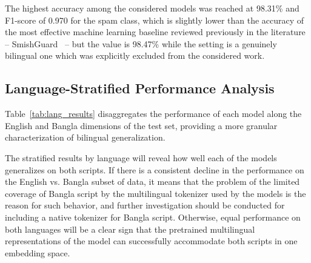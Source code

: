 \documentclass[journal]{IEEEtran}
\begin{document}
The highest accuracy among the considered models was reached at 98.31\%
and F1-score of 0.970 for the spam class, which is slightly lower than
the accuracy of the most effective machine learning baseline reviewed
previously in the literature -- SmishGuard~\cite{ref6} -- but the value is
98.47\% while the setting is a genuinely bilingual one which was
explicitly excluded from the considered work.

\subsection{Language-Stratified Performance Analysis}

Table~\ref{tab:lang_results} disaggregates the performance of each model along the English
and Bangla dimensions of the test set, providing a more granular
characterization of bilingual generalization.

\begin{table}[htbp]
\caption{Per-Language Performance Breakdown}
\label{tab:lang_results}
\begin{center}
\end{center}
\end{table}



The stratified results by language will reveal how well each of the
models generalizes on both scripts. If there is a consistent decline in
the performance on the English vs. Bangla subset of data, it means that
the problem of the limited coverage of Bangla script by the multilingual
tokenizer used by the models is the reason for such behavior, and
further investigation should be conducted for including a native
tokenizer for Bangla script. Otherwise, equal performance on both
languages will be a clear sign that the pretrained multilingual
representations of the model can successfully accommodate both scripts
in one embedding space.
\end{document}
